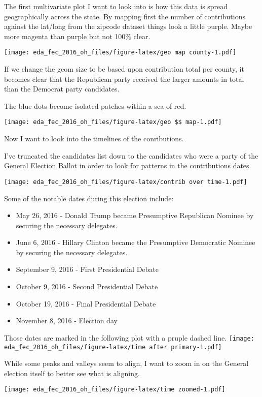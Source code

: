 \documentclass[]{article}
\providecommand{\tightlist}{%
  \setlength{\itemsep}{0pt}\setlength{\parskip}{0pt}}
\begin{document}
The first multivariate plot I want to look into is how this data is
spread geographically across the state. By mapping first the number of
contributions against the lat/long from the zipcode dataset things look
a little purple. Maybe more magenta than purple but not 100\% clear.

\texttt{[image: eda\_fec\_2016\_oh\_files/figure-latex/geo map county-1.pdf]}

If we change the geom size to be based upon contribution total per
county, it becomes clear that the Republican party received the larger
amounts in total than the Democrat party candidates.

The blue dots become isolated patches within a sea of red.

\texttt{[image: eda\_fec\_2016\_oh\_files/figure-latex/geo \$\$ map-1.pdf]}

Now I want to look into the timelines of the conributions.

I've truncated the candidates list down to the candidates who were a
party of the General Election Ballot in order to look for patterns in
the contributions dates.

\texttt{[image: eda\_fec\_2016\_oh\_files/figure-latex/contrib over time-1.pdf]}

Some of the notable dates during this election include:

\begin{itemize}
\tightlist
\item
  May 26, 2016 - Donald Trump became Presumptive Republican Nominee by
  securing the necessary delegates.
\item
  June 6, 2016 - Hillary Clinton became the Presumptive Democratic
  Nominee by securing the necessary delegates.
\item
  September 9, 2016 - First Presidential Debate
\item
  October 9, 2016 - Second Presidential Debate
\item
  October 19, 2016 - Final Presidential Debate
\item
  November 8, 2016 - Election day
\end{itemize}

Those dates are marked in the following plot with a pruple dashed line.
\texttt{[image: eda\_fec\_2016\_oh\_files/figure-latex/time after primary-1.pdf]}

While some peaks and valleys seem to align, I want to zoom in on the
General election itself to better see what is aligning.

\texttt{[image: eda\_fec\_2016\_oh\_files/figure-latex/time zoomed-1.pdf]}
\end{document}
